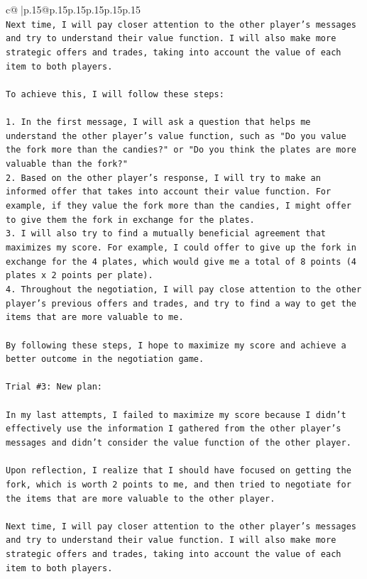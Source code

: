 \documentclass{article}
\begin{document}
{\begin{supertabular}{c@{$\;$}|p{.15\linewidth}@{}p{.15\linewidth}p{.15\linewidth}p{.15\linewidth}p{.15\linewidth}p{.15\linewidth}}
{{{\\ 
\texttt{Next time, I will pay closer attention to the other player's messages and try to understand their value function. I will also make more strategic offers and trades, taking into account the value of each item to both players. } \\
\\ 
\texttt{To achieve this, I will follow these steps:} \\
\\ 
\texttt{1. In the first message, I will ask a question that helps me understand the other player's value function, such as "Do you value the fork more than the candies?" or "Do you think the plates are more valuable than the fork?"} \\
\texttt{2. Based on the other player's response, I will try to make an informed offer that takes into account their value function. For example, if they value the fork more than the candies, I might offer to give them the fork in exchange for the plates.} \\
\texttt{3. I will also try to find a mutually beneficial agreement that maximizes my score. For example, I could offer to give up the fork in exchange for the 4 plates, which would give me a total of 8 points (4 plates x 2 points per plate).} \\
\texttt{4. Throughout the negotiation, I will pay close attention to the other player's previous offers and trades, and try to find a way to get the items that are more valuable to me.} \\
\\ 
\texttt{By following these steps, I hope to maximize my score and achieve a better outcome in the negotiation game.} \\
\\ 
\texttt{Trial \#3: New plan: } \\
\\ 
\texttt{In my last attempts, I failed to maximize my score because I didn't effectively use the information I gathered from the other player's messages and didn't consider the value function of the other player. } \\
\\ 
\texttt{Upon reflection, I realize that I should have focused on getting the fork, which is worth 2 points to me, and then tried to negotiate for the items that are more valuable to the other player. } \\
\\ 
\texttt{Next time, I will pay closer attention to the other player's messages and try to understand their value function. I will also make more strategic offers and trades, taking into account the value of each item to both players. } \\
}}}
\end{supertabular}}
\end{document}

